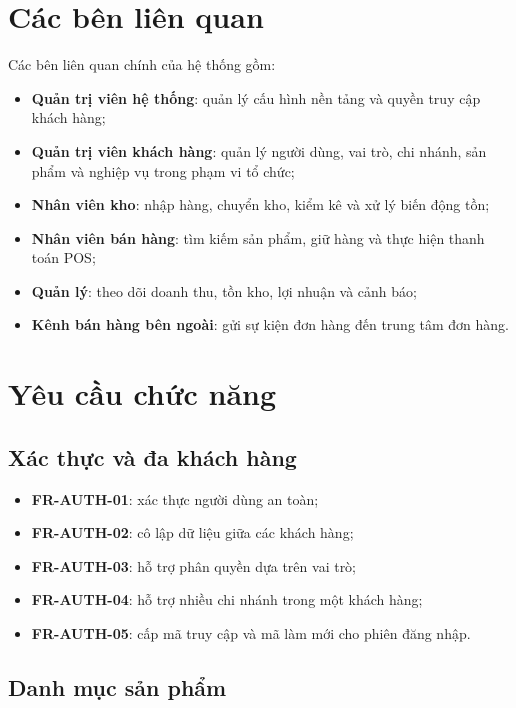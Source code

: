 \section{Các bên liên quan}

Các bên liên quan chính của hệ thống gồm:

\begin{itemize}
    \item \textbf{Quản trị viên hệ thống}: quản lý cấu hình nền tảng và quyền truy cập khách hàng;
    \item \textbf{Quản trị viên khách hàng}: quản lý người dùng, vai trò, chi nhánh, sản phẩm và nghiệp vụ trong phạm vi tổ chức;
    \item \textbf{Nhân viên kho}: nhập hàng, chuyển kho, kiểm kê và xử lý biến động tồn;
    \item \textbf{Nhân viên bán hàng}: tìm kiếm sản phẩm, giữ hàng và thực hiện thanh toán POS;
    \item \textbf{Quản lý}: theo dõi doanh thu, tồn kho, lợi nhuận và cảnh báo;
    \item \textbf{Kênh bán hàng bên ngoài}: gửi sự kiện đơn hàng đến trung tâm đơn hàng.
\end{itemize}

\section{Yêu cầu chức năng}

\subsection{Xác thực và đa khách hàng}

\begin{itemize}
    \item \textbf{FR-AUTH-01}: xác thực người dùng an toàn;
    \item \textbf{FR-AUTH-02}: cô lập dữ liệu giữa các khách hàng;
    \item \textbf{FR-AUTH-03}: hỗ trợ phân quyền dựa trên vai trò;
    \item \textbf{FR-AUTH-04}: hỗ trợ nhiều chi nhánh trong một khách hàng;
    \item \textbf{FR-AUTH-05}: cấp mã truy cập và mã làm mới cho phiên đăng nhập.
\end{itemize}

\subsection{Danh mục sản phẩm}


